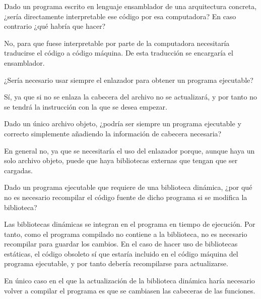 \begin{ejercicio}\label{ej:3.Ejercicio10}
    Dado un programa escrito en lenguaje ensamblador de una arquitectura concreta, ¿sería directamente interpretable ese código por esa computadora? En caso contrario ¿qué habría que hacer?

    No, para que fuese interpretable por parte de la computadora necesitaría traducirse el código a código máquina. De esta traducción se encargaría el ensamblador.
\end{ejercicio}

\begin{ejercicio}\label{ej:3.Ejercicio11}
    ¿Sería necesario usar siempre el enlazador para obtener un programa ejecutable?

    Sí, ya que si no se enlaza la cabecera del archivo no se actualizará, y por tanto no se tendrá la instrucción con la que se desea empezar.
\end{ejercicio}

\begin{ejercicio}\label{ej:3.Ejercicio12}
    Dado un único archivo objeto, ¿podría ser siempre un programa ejecutable y correcto simplemente añadiendo la información de cabecera necesaria?

    En general no, ya que se necesitaría el uso del enlazador porque, aunque haya un solo archivo objeto, puede que haya bibliotecas externas que tengan que ser cargadas. 
\end{ejercicio}

\begin{ejercicio}\label{ej:3.Ejercicio13}
    Dado un programa ejecutable que requiere de una biblioteca dinámica, ¿por qué no es necesario recompilar el código fuente de dicho programa si se modifica la biblioteca?

    Las bibliotecas dinámicas se integran en el programa en tiempo de ejecución. Por tanto, como el programa compilado no contiene a la biblioteca, no es necesario recompilar para guardar los cambios. En el caso de hacer uso de bibliotecas estáticas, el código obsoleto sí que estaría incluido en el código máquina del programa ejecutable, y por tanto debería recompilarse para actualizarse.

    En único caso en el que la actualización de la biblioteca dinámica haría necesario volver a compilar el programa es que se cambiasen las cabeceras de las funciones.
\end{ejercicio}

